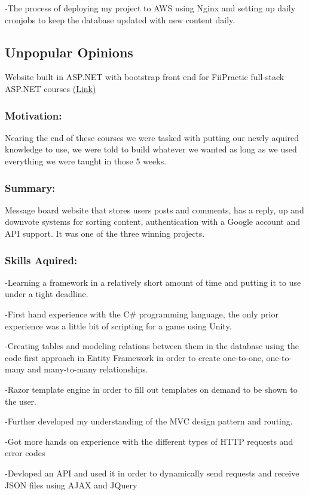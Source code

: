 \documentclass[a4paper,hidelinks,12pt]{article}
\begin{document}
-The process of deploying my project to AWS using Nginx and setting up daily cronjobs to keep the database updated with new
content daily.

\subsection{Unpopular Opinions}
Website built in ASP.NET with bootstrap front end for FiiPractic full-stack ASP.NET courses \href{https://github.com/IureaMarius/UnpopularOpinions}{(Link)}
\subsubsection{Motivation:}
Nearing the end of these courses we were tasked with putting our newly aquired knowledge to use, we were told
to build whatever we wanted as long as we used everything we were taught in those 5 weeks. 
\subsubsection{Summary:}
Message board website that stores users posts and comments, has a reply, up and downvote systems for sorting
content, authentication with a Google account and API support. It was one of the three winning projects.
\subsubsection{Skills Aquired:}

-Learning a framework in a relatively short amount of time and putting it to use under a tight deadline.

-First hand experience with the C\# programming language, the only prior experience was a little bit of 
scripting for a game using Unity.

-Creating tables and modeling relations between them in the database using the code first approach in Entity
Framework in order to create one-to-one, one-to-many and many-to-many relationships.

-Razor template engine in order to fill out templates on demand to be shown to the user.

-Further developed my understanding of the MVC design pattern and routing.

-Got more hands on experience with the different types of HTTP requests and error codes

-Devloped an API and used it in order to dynamically send requests and receive JSON files using AJAX and JQuery
\end{document}
